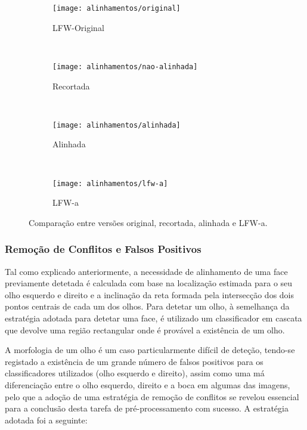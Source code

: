 \begin{figure}[t]
        \centering
        \begin{subfigure}[b]{0.2\textwidth}
                \centering
                \texttt{[image: alinhamentos/original]}
                \caption{LFW-Original}
                \label{fig:alinha_original}
        \end{subfigure}%
        ~ 
        \begin{subfigure}[b]{0.2\textwidth}
                \centering
                \texttt{[image: alinhamentos/nao-alinhada]}
                \caption{Recortada}
                \label{fig:alinha_nao-alinhada}
        \end{subfigure}
        ~ 
        \begin{subfigure}[b]{0.2\textwidth}
                \centering
                \texttt{[image: alinhamentos/alinhada]}
                \caption{Alinhada}
                \label{fig:alinha_alinhada}
        \end{subfigure}
        ~ 
        \begin{subfigure}[b]{0.2\textwidth}
                \centering
                \texttt{[image: alinhamentos/lfw-a]}
                \caption{LFW-a}
                \label{fig:alinha_lfw-a}
        \end{subfigure}
        \caption{Comparação entre versões original, recortada, alinhada e LFW-a.}\label{fig:alinhamentos}
\end{figure}

\subsubsection*{Remoção de Conflitos e Falsos Positivos}
Tal como explicado anteriormente, a necessidade de alinhamento de uma face previamente detetada é calculada com base na localização estimada para o seu olho esquerdo e direito e a inclinação da reta formada pela intersecção dos dois pontos centrais de cada um dos olhos. Para detetar um olho, à semelhança da estratégia adotada para detetar uma face, é utilizado um classificador em cascata que devolve uma região rectangular onde é provável a existência de um olho. 

A morfologia de um olho é um caso particularmente difícil de deteção, tendo-se registado a existência de um grande número de falsos positivos para os classificadores utilizados (olho esquerdo e direito), assim como uma má diferenciação entre o olho esquerdo, direito e a boca em algumas das imagens, pelo que a adoção de uma estratégia de remoção de conflitos se revelou essencial para a conclusão desta tarefa de pré-processamento com sucesso. A estratégia adotada foi a seguinte:


